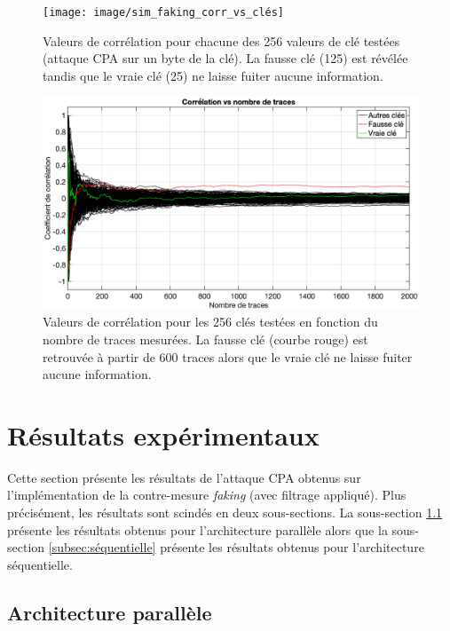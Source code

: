 \documentclass[oneside]{book}
\begin{document}
\begin{figure}[htbp]
    \hspace{-2cm}
    \texttt{[image: image/sim\_faking\_corr\_vs\_clés]}
    \caption{Valeurs de corrélation pour chacune des 256 valeurs de clé testées (attaque CPA sur un byte de la clé). La fausse clé (125) est révélée tandis que le vraie clé (25) ne laisse fuiter aucune information.}
    \label{fig:sim_faking_corr_vs_clés} 
    \hspace{-2cm}
    \includegraphics[scale=0.4]{image/sim_faking_corr_vs_nb_traces}
    \caption{Valeurs de corrélation pour les 256 clés testées en fonction du nombre de traces mesurées. La fausse clé (courbe rouge) est retrouvée à partir de 600 traces alors que le vraie clé ne laisse fuiter aucune information.}
    \label{fig:sim_faking_corr_vs_nb_traces} 
\end{figure}


\newpage

\section{Résultats expérimentaux}
\label{sec:Exp_Results_Faking}

Cette section présente les résultats de l'attaque CPA obtenus sur l'implémentation de la contre-mesure \textit{faking} (avec filtrage appliqué). Plus précisément, les résultats sont scindés en deux sous-sections. La sous-section \ref{subsec:parallèle} présente les résultats obtenus pour l'architecture parallèle alors que la sous-section \ref{subsec:séquentielle} présente les résultats obtenus pour l'architecture séquentielle.

\subsection{Architecture parallèle}
\label{subsec:parallèle}
\end{document}
